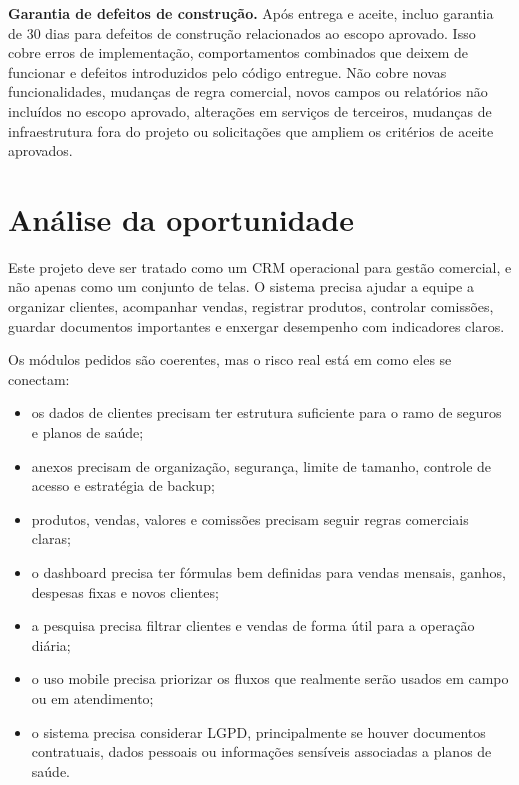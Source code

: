 \documentclass[11pt,a4paper]{article}
\begin{document}
\textbf{Garantia de defeitos de construção.} Após entrega e aceite, incluo garantia de 30 dias para defeitos de construção relacionados ao escopo aprovado. Isso cobre erros de implementação, comportamentos combinados que deixem de funcionar e defeitos introduzidos pelo código entregue. Não cobre novas funcionalidades, mudanças de regra comercial, novos campos ou relatórios não incluídos no escopo aprovado, alterações em serviços de terceiros, mudanças de infraestrutura fora do projeto ou solicitações que ampliem os critérios de aceite aprovados.\par

\section*{Análise da oportunidade}

Este projeto deve ser tratado como um CRM operacional para gestão comercial, e não apenas como um conjunto de telas. O sistema precisa ajudar a equipe a organizar clientes, acompanhar vendas, registrar produtos, controlar comissões, guardar documentos importantes e enxergar desempenho com indicadores claros.\par

Os módulos pedidos são coerentes, mas o risco real está em como eles se conectam:\par

\begin{itemize}
\item os dados de clientes precisam ter estrutura suficiente para o ramo de seguros e planos de saúde;
\item anexos precisam de organização, segurança, limite de tamanho, controle de acesso e estratégia de backup;
\item produtos, vendas, valores e comissões precisam seguir regras comerciais claras;
\item o dashboard precisa ter fórmulas bem definidas para vendas mensais, ganhos, despesas fixas e novos clientes;
\item a pesquisa precisa filtrar clientes e vendas de forma útil para a operação diária;
\item o uso mobile precisa priorizar os fluxos que realmente serão usados em campo ou em atendimento;
\item o sistema precisa considerar LGPD, principalmente se houver documentos contratuais, dados pessoais ou informações sensíveis associadas a planos de saúde.
\end{itemize}
\end{document}
